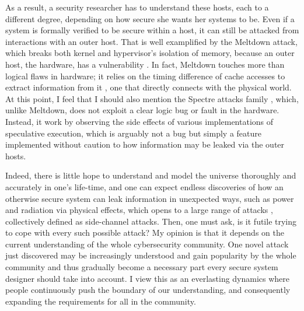 \documentclass[10pt]{article}
\begin{document}
As a result, a security researcher has to understand these hosts, each to a
different degree, depending on how secure she wants her systems to be. Even if
a system is formally verified to be secure within a host, it can still be
attacked from interactions with an outer host. That is well examplified by
the Meltdown attack, which breaks both kernel and hypervisor's isolation of
memory, because an outer host, the hardware, has a vulnerability
\cite{meltdown}. In fact, Meltdown touches more than logical flaws in hardware;
it relies on the timing difference of cache accesses to extract information
from it \cite{flush.reload}, one that directly connects with the physical
world. At this point, I feel that I should also mention the Spectre attacks
family \cite{spectre}, which, unlike Meltdown, does not exploit a clear logic
bug or fault in the hardware. Instead, it work by observing the side effects
of various implementations of speculative execution, which is arguably not a
bug but simply a feature implemented without caution to how information may be
leaked via the outer hosts.

Indeed, there is little hope to understand and model the universe thoroughly
and accurately in one's life-time, and one can expect endless discoveries of
how an otherwise secure system can leak information in unexpected ways, such as
power and radiation via physical effects, which opens to a large range of
attacks \cite{side.channel.1, side.channel.2, side.channel.3, flush.reload},
collectively defined as side-channel attacks.  Then, one must ask, is it futile
trying to cope with every such possible attack? My opinion is that it depends
on the current understanding of the whole cybersecurity community. One novel
attack just discovered may be increasingly understood and gain popularity by
the whole community and thus gradually become a necessary part every secure
system designer should take into account. I view this as an everlasting
dynamics where people continuously push the boundary of our understanding, and
consequently expanding the requirements for all in the community.
\end{document}
